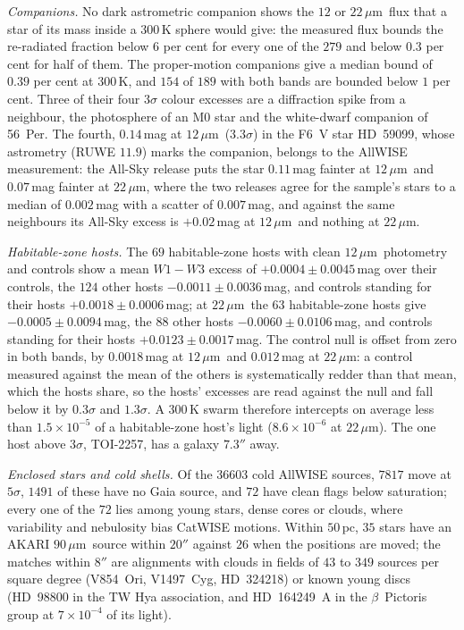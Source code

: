 \documentclass[3p,11pt]{elsarticle}
\newcommand{\um}{\,$\mu$m}
\newcommand{\sci}[2]{#1\times10^{#2}}
\begin{document}
\emph{Companions.} No dark astrometric companion shows the $12$ or $22$\um\ flux that a
star of its mass inside a $300$\,K sphere would give: the measured flux bounds the
re-radiated fraction below $6$ per cent for every one of the $279$ and below $0.3$ per
cent for half of them. The proper-motion companions give a median bound of $0.39$ per
cent at $300$\,K, and $154$ of $189$ with both bands are bounded below $1$ per cent.
Three of their four $3\sigma$ colour excesses are a diffraction spike from a neighbour,
the photosphere of an M0 star and the white-dwarf companion of 56~Per. The fourth,
$0.14$\,mag at $12$\um\ ($3.3\sigma$) in the F6~V star HD~59099, whose astrometry
(RUWE $11.9$) marks the companion, belongs to the AllWISE measurement: the All-Sky
release puts the star $0.11$\,mag fainter at $12$\um\ and $0.07$\,mag fainter at
$22$\um, where the two releases agree for the sample's stars to a median of
$0.002$\,mag with a scatter of $0.007$\,mag, and against the same neighbours its
All-Sky excess is $+0.02$\,mag at $12$\um\ and nothing at $22$\um.

\emph{Habitable-zone hosts.} The $69$ habitable-zone hosts with clean $12$\um\
photometry and controls show a mean $W1-W3$ excess of $+0.0004\pm0.0045$\,mag over their
controls, the $124$ other hosts $-0.0011\pm0.0036$\,mag, and controls standing for their
hosts $+0.0018\pm0.0006$\,mag; at $22$\um\ the $63$ habitable-zone hosts give
$-0.0005\pm0.0094$\,mag, the $88$ other hosts $-0.0060\pm0.0106$\,mag, and controls
standing for their hosts $+0.0123\pm0.0017$\,mag. The control null is offset from zero
in both bands, by $0.0018$\,mag at $12$\um\ and $0.012$\,mag at $22$\um: a control
measured against the mean of the others is systematically redder than that mean, which
the hosts share, so the hosts' excesses are read against the null and fall below it by
$0.3\sigma$ and $1.3\sigma$. A $300$\,K swarm therefore intercepts on average less than
$\sci{1.5}{-5}$ of a habitable-zone host's light ($\sci{8.6}{-6}$ at $22$\um). The one
host above $3\sigma$, TOI-2257, has a galaxy $7.3''$ away.

\emph{Enclosed stars and cold shells.} Of the $36603$ cold AllWISE sources, $7817$ move
at $5\sigma$, $1491$ of these have no Gaia source, and $72$ have clean flags below
saturation; every one of the $72$ lies among young stars, dense cores or clouds, where
variability and nebulosity bias CatWISE motions. Within $50$\,pc, $35$ stars have an
AKARI $90$\um\ source within $20''$ against $26$ when the positions are moved; the
matches within $8''$ are alignments with clouds in fields of $43$ to $349$ sources per
square degree (V854~Ori, V1497~Cyg, HD~324218) or known young discs (HD~98800 in the TW
Hya association, and HD~164249~A in the $\beta$~Pictoris group at $\sci{7}{-4}$ of its
light).
\end{document}
